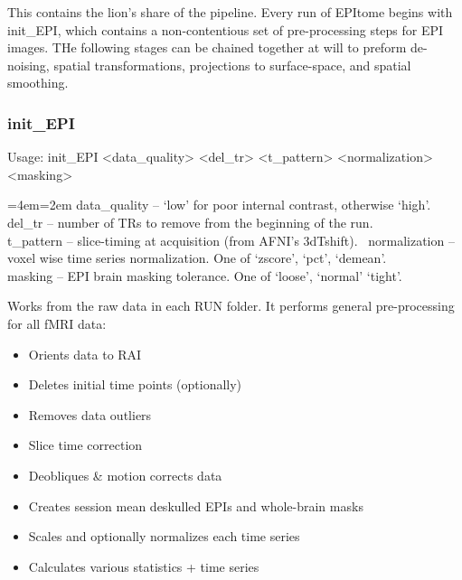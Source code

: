 \documentclass[final,titlepage,letterpaper,oneside,12pt]{article}
\renewcommand{\texttt}[2][BrickRed]{\textcolor{#1}{\ttfamily #2}}%
\newenvironment{blockquote}{%
  \par%
  \medskip
  \leftskip=4em\rightskip=2em%
  \noindent\ignorespaces}{%
  \par\medskip}
\begin{document}
This contains the lion's share of the pipeline. Every run of EPItome begins with \texttt{init\_EPI}, which contains a non-contentious set of pre-processing steps for EPI images. THe following stages can be chained together at will to preform de-noising, spatial transformations, projections to surface-space, and spatial smoothing.

\subsubsection{init\_EPI}
Usage: \texttt{init\_EPI <data\_quality> <del\_tr> <t\_pattern> <normalization> <masking>}

\begin{blockquote}
data\_quality -- `low' for poor internal contrast, otherwise `high'. \\
del\_tr -- number of TRs to remove from the beginning of the run. \\
t\_pattern -- slice-timing at acquisition (from AFNI's 3dTshift). \
normalization -- voxel wise time series normalization. One of `zscore', `pct', `demean'. \\
masking -- EPI brain masking tolerance. One of `loose', `normal' `tight'. \
\end{blockquote}

\noindent Works from the raw data in each RUN folder. It performs general pre-processing for all fMRI data:

\begin{itemize} \itemsep-2pt
    \item{Orients data to RAI}
    \item{Deletes initial time points (optionally)}
    \item{Removes data outliers}
    \item{Slice time correction}
    \item{Deobliques \& motion corrects data}
    \item{Creates session mean deskulled EPIs and whole-brain masks}
    \item{Scales and optionally normalizes each time series}
    \item{Calculates various statistics + time series}
\end{itemize}
\end{document}
